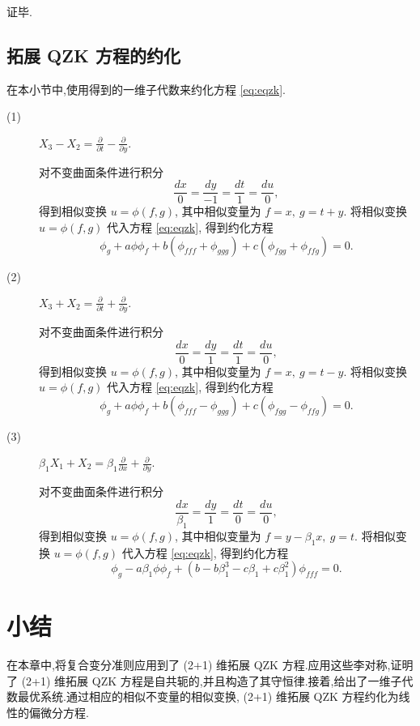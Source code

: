 证毕.

\subsection{拓展 QZK 方程的约化}\label{sec:05reduction}
在本小节中,使用得到的一维子代数来约化方程 \eqref{eq:eqzk}.
\begin{description}

\item[(1)] $X_3-X_2=\frac{\partial}{\partial t}-\frac{\partial}{\partial y}.$

对不变曲面条件进行积分
\begin{equation*}
	\frac{dx}{0}=\frac{dy}{-1}=\frac{dt}{1}=\frac{du}{0},
\end{equation*}
得到相似变换 $u=\phi(f,g)$, 其中相似变量为 $f=x,~g=t+y$.
将相似变换 $u=\phi(f,g)$ 代入方程 \eqref{eq:eqzk}, 得到约化方程
\begin{equation*}
	\phi_g+a\phi \phi_f+b(\phi_{fff}+\phi_{ggg})+c(\phi_{fgg}+\phi_{ffg})=0.
\end{equation*}

\item[(2)]$X_3+X_2=\frac{\partial}{\partial t}+\frac{\partial}{\partial y}.$

对不变曲面条件进行积分
\begin{equation*}
	\frac{dx}{0}=\frac{dy}{1}=\frac{dt}{1}=\frac{du}{0},
\end{equation*}
得到相似变换 $u=\phi(f,g)$, 其中相似变量为 $f=x,~g=t-y$.
将相似变换 $u=\phi(f,g)$ 代入方程 \eqref{eq:eqzk}, 得到约化方程
\begin{equation*}
	\phi_g+a\phi \phi_f+b(\phi_{fff}-\phi_{ggg})+c(\phi_{fgg}-\phi_{ffg})=0.
\end{equation*}

\item[(3)]$\beta_1X_1+X_2=\beta_1\frac{\partial}{\partial x}+\frac{\partial}{\partial y}.$

对不变曲面条件进行积分
\begin{equation*}
	\frac{dx}{\beta_1}=\frac{dy}{1}=\frac{dt}{0}=\frac{du}{0},
\end{equation*}
得到相似变换 $u=\phi(f,g)$, 其中相似变量为 $f=y-\beta_1x,~g=t$.
将相似变换 $u=\phi(f,g)$ 代入方程 \eqref{eq:eqzk}, 得到约化方程
\begin{equation*}
	\phi_g-a\beta_1\phi \phi_f+(b-b\beta_1^3-c\beta_1+c\beta_1^2)\phi_{fff}=0.
\end{equation*}
\end{description}


\section{小结}\label{sec:05conclusion}
在本章中,将复合变分准则应用到了 (2+1) 维拓展 QZK 方程.应用这些李对称,证明了 (2+1) 维拓展 QZK 方程是自共轭的,并且构造了其守恒律.接着,给出了一维子代数最优系统.通过相应的相似不变量的相似变换, (2+1) 维拓展 QZK 方程约化为线性的偏微分方程.
